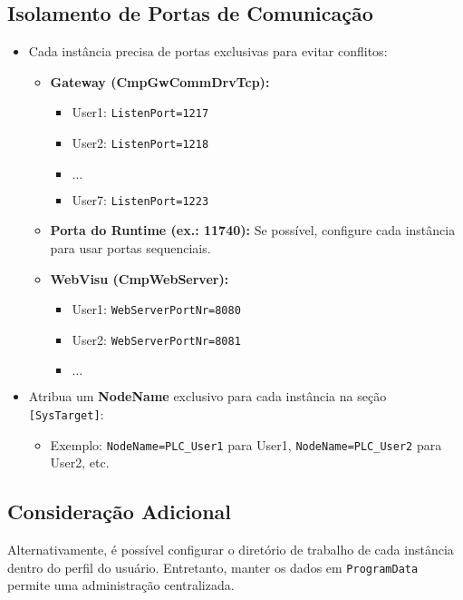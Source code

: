 \documentclass[12pt,a4paper]{article}
\begin{document}
\subsection{Isolamento de Portas de Comunicação}
\begin{itemize}[label=\textbullet]
  \item Cada instância precisa de portas exclusivas para evitar conflitos:
    \begin{itemize}
      \item \textbf{Gateway (CmpGwCommDrvTcp):}
        \begin{itemize}
          \item User1: \texttt{ListenPort=1217}
          \item User2: \texttt{ListenPort=1218}
          \item $\ldots$
          \item User7: \texttt{ListenPort=1223}
        \end{itemize}
      \item \textbf{Porta do Runtime (ex.: 11740):} Se possível, configure cada instância para usar portas sequenciais.
      \item \textbf{WebVisu (CmpWebServer):}
        \begin{itemize}
          \item User1: \texttt{WebServerPortNr=8080}
          \item User2: \texttt{WebServerPortNr=8081}
          \item $\ldots$
        \end{itemize}
    \end{itemize}
  \item Atribua um \textbf{NodeName} exclusivo para cada instância na seção \texttt{[SysTarget]}:
    \begin{itemize}
      \item Exemplo: \texttt{NodeName=PLC\_User1} para User1, \texttt{NodeName=PLC\_User2} para User2, etc.
    \end{itemize}
\end{itemize}

\subsection{Consideração Adicional}
Alternativamente, é possível configurar o diretório de trabalho de cada instância dentro do perfil do usuário. Entretanto, manter os dados em \texttt{ProgramData} permite uma administração centralizada.
\end{document}
